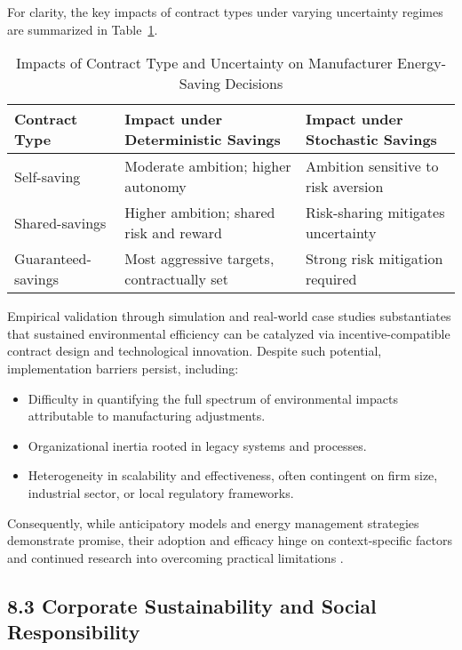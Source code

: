 \documentclass[11pt]{article}
\begin{document}
For clarity, the key impacts of contract types under varying uncertainty regimes are summarized in Table~\ref{tab:contract_comparison}.

\begin{table}[ht]
\centering
\caption{Impacts of Contract Type and Uncertainty on Manufacturer Energy-Saving Decisions}
\label{tab:contract_comparison}
\begin{tabular}{|l|l|l|}
\hline
\textbf{Contract Type} & \textbf{Impact under Deterministic Savings} & \textbf{Impact under Stochastic Savings} \\
\hline
Self-saving            & Moderate ambition; higher autonomy          & Ambition sensitive to risk aversion      \\
Shared-savings         & Higher ambition; shared risk and reward     & Risk-sharing mitigates uncertainty       \\
Guaranteed-savings     & Most aggressive targets, contractually set  & Strong risk mitigation required          \\
\hline
\end{tabular}
\end{table}

Empirical validation through simulation and real-world case studies substantiates that sustained environmental efficiency can be catalyzed via incentive-compatible contract design and technological innovation. Despite such potential, implementation barriers persist, including:

\begin{itemize}
    \item Difficulty in quantifying the full spectrum of environmental impacts attributable to manufacturing adjustments.
    \item Organizational inertia rooted in legacy systems and processes.
    \item Heterogeneity in scalability and effectiveness, often contingent on firm size, industrial sector, or local regulatory frameworks.
\end{itemize}

Consequently, while anticipatory models and energy management strategies demonstrate promise, their adoption and efficacy hinge on context-specific factors and continued research into overcoming practical limitations \cite{ref80}.

\subsection{8.3 Corporate Sustainability and Social Responsibility}
\end{document}
